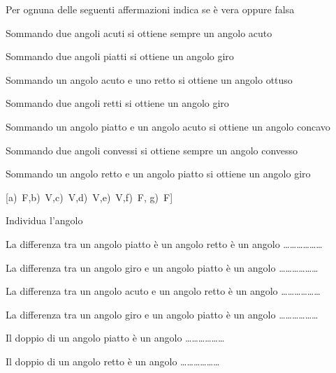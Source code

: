 \begin{esercizio}
\label{ese:1.77}
Per ognuna delle seguenti affermazioni indica se è vera oppure falsa
\vspace{-6pt}
\begin{enumeratea}
\item Sommando due angoli acuti si ottiene sempre un angolo acuto
\hfill\boxV\quad\boxF
\item Sommando due angoli piatti si ottiene un angolo giro
\hfill\boxV\quad\boxF
\item Sommando un angolo acuto e uno retto si ottiene un angolo ottuso
\hfill\boxV\quad\boxF
\item Sommando due angoli retti si ottiene un angolo giro
\hfill\boxV\quad\boxF
\item Sommando un angolo piatto e un angolo acuto si ottiene un 
angolo concavo
\hfill\boxV\quad\boxF
\item Sommando due angoli convessi si ottiene sempre un angolo convesso
\hfill\boxV\quad\boxF
\item Sommando un angolo retto e un angolo piatto si ottiene un 
angolo giro
\hfill\boxV\quad\boxF
\end{enumeratea}
\hfill[a)~F,\quad b)~V,\quad c)~V,\quad d)~V,\quad e)~V,\quad f)~F,\quad 
g)~F]
\end{esercizio}

\begin{esercizio}
\label{ese:1.78}
Individua l'angolo
\vspace{-6pt}
\begin{enumeratea}
\item La differenza tra un angolo piatto è un angolo retto è un 
angolo \ldots\ldots\ldots\ldots\ldots\ldots{}
\item La differenza tra un angolo giro e un angolo piatto è un angolo 
\ldots\ldots\ldots\ldots\ldots\ldots{}
\item La differenza tra un angolo acuto e un angolo retto è un angolo 
\ldots\ldots\ldots\ldots\ldots\ldots{}
\item La differenza tra un angolo giro e un angolo piatto è un angolo 
\ldots\ldots\ldots\ldots\ldots\ldots{}
\item Il doppio di un angolo piatto è un angolo 
\ldots\ldots\ldots\ldots\ldots\ldots{}
\item Il doppio di un angolo retto è un angolo 
\ldots\ldots\ldots\ldots\ldots\ldots{}
\end{enumeratea}
\end{esercizio}
	
